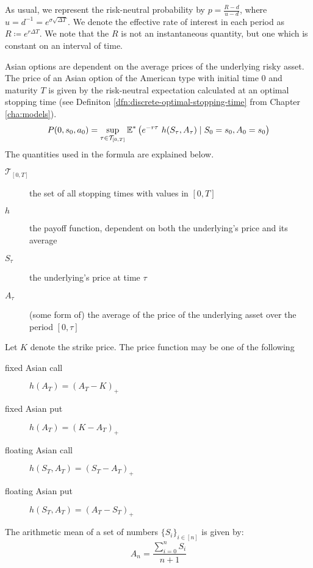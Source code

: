 As usual, we represent the risk-neutral probability by $ p = \frac{R - d}{u - d} $, where $ u = d^{-1} = e^{\sigma \sqrt{\Delta T}} $. We denote the effective rate of interest in each period as $ R \coloneqq e^{r \Delta T} $. We note that the $R$ is not an instantaneous quantity, but one which is constant on an interval of time.

Asian options are dependent on the average prices of the underlying risky asset. The price of an Asian option of the American type with initial time $ 0 $ and maturity $ T $ is given by the risk-neutral expectation calculated at an optimal stopping time (see Definiton \ref{dfn:discrete-optimal-stopping-time} from Chapter \ref{cha:models}).
\begin{equation}
	P(0, s_0, a_0) = \sup_{\tau \in \mathcal{T}_{[0,T]}}  \operatorname{\mathbb{E}}^* \left(  e^{-r \tau} \  h(S_{\tau}, A_{\tau})  \mid  S_0 = s_0, A_0 = s_0  \right)
\end{equation}
The quantities used in the formula are explained below.
\begin{description}
	\item[$ \mathcal{T}_{[0,T]} $] the set of all stopping times with values in $ [0, T ] $
	\item[$ h $] the payoff function, dependent on both the underlying's price and its average
	\item[$ S_{\tau} $] the underlying's price at time $ \tau $
	\item[$ A_{\tau} $] (some form of) the average of the price of the underlying asset over the period $ [0, \tau] $
\end{description}

Let $ K $ denote the strike price. The price function may be one of the following
\begin{description}
	\item[fixed Asian call] $ h(A_T) = (A_T - K)_+ $
	\item[fixed Asian put] $ h(A_T) = (K - A_T)_+ $
	\item[floating Asian call] $ h(S_T, A_T) = (S_T - A_T)_+ $
	\item[floating Asian put] $ h(S_T, A_T) = (A_T - S_T)_+ $
\end{description}


\begin{dfn}
	The arithmetic mean of a set of numbers $ \{ S_i \}_{i \in [n]} $ is given by:
	\begin{equation}
	\label{eq:am}
	A_{n} = \frac{\sum_{i=0}^n S_i}{n+1}
	\end{equation}
\end{dfn}

